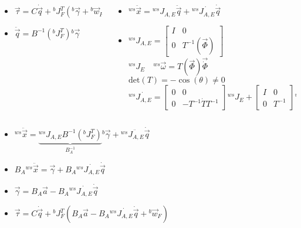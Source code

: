 \begin{frame}[shrink=10]
  \begin{columns}[t]
    \begin{column}{0.4\textwidth}
      \begin{itemize}
      \item<2->[] $\vec{\tau} = C \dot{\vec{q}} + {}^{b}J^{T}_{F} ({}^b\vec{\gamma} + {}^b\vec{w}_{F})$
      \item<3->[] $\ddot{\vec{q}} = B^{-1} ({}^{b}J^{T}_{F}) {}^b\vec{\gamma}$
      \end{itemize}
    \end{column}
    \begin{column}{0.8\textwidth}
      \begin{itemize}
      \item<4->[] ${}^{ws} \ddot{\vec{x}} = {}^{ws} J_{A,E} \ddot{\vec{q}} + {}^{ws} \dot{J_{A,E}} \dot{\vec{q}}$
      \item<5->[] ${}^{ws} J_{A,E} = 
        \left[
          \begin{smallmatrix}
            I & 0 \\
            0 & T^{-1}(\vec{\Phi})
          \end{smallmatrix}
          \right]$
        ${}^{ws} J_{E} \quad {}^{ws}\vec{\omega} = T(\vec{\Phi}) \vec{\dot{\Phi}}$\\
        $\mathrm{det}(T) = -\cos(\theta) \neq 0$\\
        ${}^{ws} \dot{J_{A,E}} = 
        \left[
          \begin{smallmatrix}
            0 & 0 \\
            0 & -T^{-1} \dot{T} T^{-1}
          \end{smallmatrix}
          \right]
             {}^{ws} J_{E} + 
             \left[
               \begin{smallmatrix}
                 I & 0 \\
                 0 & T^{-1}
               \end{smallmatrix}
               \right]
                  {}^{ws} \dot{J}_{E}$
      \end{itemize}
    \end{column}
  \end{columns}
    \begin{itemize}
    \item<6->[]${}^{ws} \ddot{\vec{x}} = \underbrace{{}^{ws} J_{A,E} B^{-1} ({}^b J_{F}^T)}_{B_A^{-1}} {}^b \vec{\gamma} + {}^{ws} \ddot{J_{A,E}} \dot{\vec{q}}$
    \item<7->[]$B_A {}^{ws} \ddot{\vec{x}} =  \vec{\gamma} +  B_A  {}^{ws} \dot{J_{A,E}} \dot{\vec{q}}$
    \item<8->[]$\vec{\gamma} = B_A \vec{a} - B_A {}^{ws} \dot{J_{A,E}} \dot{\vec{q}}$
    \item<9->[]$\vec{\tau} = C \dot{\vec{q}} + {}^{b}J^{T}_{F} ( B_A \vec{a} - B_A {}^{ws} \dot{J_{A,E}} \dot{\vec{q}} + {}^b\vec{w}_{F})$
    \end{itemize}
\end{frame}

